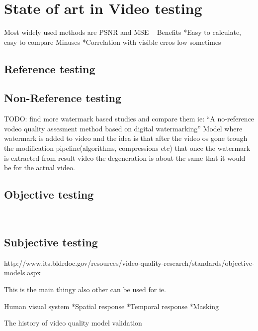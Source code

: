 
\section{State of art in Video testing}

Most widely used methods are PSNR and MSE ~\cite{4347144}
Benefits
*Easy to calculate, easy to compare
Minuses
*Correlation with visible erros low sometimes



\subsection{Reference testing}

\subsection{Non-Reference testing}




TODO: find more watermark based studies and compare them ie: ``A no-reference
vodeo quality assesment method based on digital watermarking''
Model where watermark is added to video and the idea is that after the video
os gone trough the modification pipeline(algorithms, compressions etc) that
once the watermark is extracted from result video the degeneration is about
the same that it would be for the actual video. ~\cite{1203346}



\subsection{Objective testing}

~\cite{4347144}

\subsection{Subjective testing}
http://www.its.bldrdoc.gov/resources/video-quality-research/standards/objective-models.aspx


This is the main thingy also other can be used for ie. 
~\cite{ITU_P910}

Human visual system
*Spatial response
*Temporal response
*Masking
~\cite{4347144}

The history of video quality model validation ~\cite{6659332}
